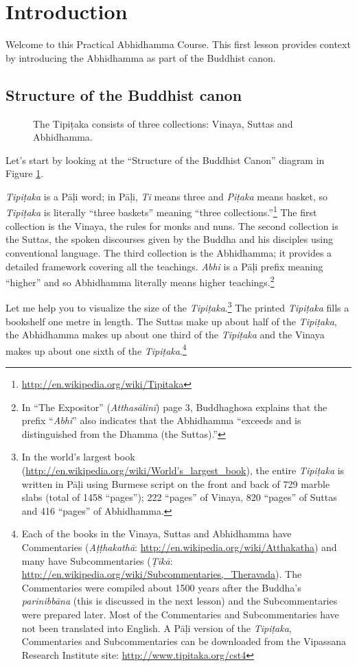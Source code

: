 \section{Introduction}

Welcome to this Practical Abhidhamma Course. This first lesson provides context by introducing the Abhidhamma as part of the Buddhist canon.

\subsection*{Structure of the Buddhist canon}

\begin{figure}[H]
\centering

\caption{The Tipiṭaka consists of three collections: Vinaya, Suttas and Abhidhamma.}
\label{fig:Tipitaka}
\end{figure}

Let’s start by looking at the “Structure of the Buddhist Canon” diagram in Figure \ref{fig:Tipitaka}.

\textit{Tipiṭaka} is a Pāḷi word; in Pāḷi, \textit{Ti} means three and \textit{Piṭaka} means basket, so \textit{Tipiṭaka} is literally “three baskets” meaning “three collections.”\footnote{\url{http://en.wikipedia.org/wiki/Tipitaka}} The first collection is the Vinaya, the rules for monks and nuns. The second collection is the Suttas, the spoken discourses given by the Buddha and his disciples using conventional language. The third collection is the Abhidhamma; it provides a detailed framework covering all the teachings. \textit{Abhi} is a Pāḷi prefix meaning “higher” and so Abhidhamma literally means higher teachings.\footnote{In “The Expositor” (\textit{Atthasālinī}) page 3, Buddhaghosa explains that the prefix “\textit{Abhi}” also indicates that the Abhidhamma “exceeds and is distinguished from the Dhamma (the Suttas).”}

Let me help you to visualize the size of the \textit{Tipiṭaka}.\footnote{In the world’s largest book (\url{http://en.wikipedia.org/wiki/World’s_largest_book}), the entire \textit{Tipiṭaka} is written in Pāḷi using Burmese script on the front and back of 729 marble slabs (total of 1458 “pages”); 222 “pages” of Vinaya, 820 “pages” of Suttas and 416 “pages” of Abhidhamma.} The printed \textit{Tipiṭaka} fills a bookshelf one metre in length. The Suttas make up about half of the \textit{Tipiṭaka}, the Abhidhamma makes up about one third of the \textit{Tipiṭaka} and the Vinaya makes up about one sixth of the \textit{Tipiṭaka}.\footnote{Each of the books in the Vinaya, Suttas and Abhidhamma have Commentaries (\textit{Aṭṭhakathā}: \url{http://en.wikipedia.org/wiki/Atthakatha}) and many have Subcommentaries (\textit{Ṭīkā}: \url{http://en.wikipedia.org/wiki/Subcommentaries,_Theravada}). The Commentaries were compiled about 1500 years after the Buddha's \textit{parinibbāna} (this is discussed in the next lesson) and the Subcommentaries were prepared later. Most of the Commentaries and Subcommentaries have not been translated into English. A Pāḷi version of the \textit{Tipiṭaka}, Commentaries and Subcommentaries can be downloaded from the Vipassana Research Institute site: \url{http://www.tipitaka.org/cst4}}


